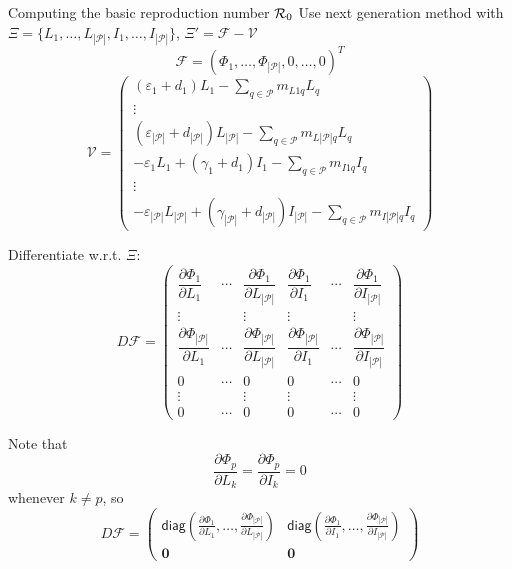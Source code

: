 \documentclass[aspectratio=169]{beamer}\usepackage[]{graphicx}\usepackage[]{xcolor}
\begin{document}
\begin{frame}{Computing the basic reproduction number $\mathcal{R}_0$}
Use next generation method with $\Xi=\{L_1,\ldots,L_{|\mathcal{P}|},I_1,\ldots,I_{|\mathcal{P}|}\}$, $\Xi'=\mathcal{F}-\mathcal{V}$
$$
\mathcal{F}=\left(\Phi_1,\ldots,\Phi_{|\mathcal{P}|},0,\ldots,0\right)^T
$$
$$
\mathcal{V}=
\begin{pmatrix}
\left( \varepsilon_{1}+d_{1}\right)L_{1}
-\sum\limits_{q\in\mathcal{P}} m_{L1q}L_{q} \\
\vdots \\
\left( \varepsilon_{|\mathcal{P}|}+d_{|\mathcal{P}|}\right)L_{|\mathcal{P}|}
-\sum\limits_{q\in\mathcal{P}} m_{L|\mathcal{P}|q}L_{q} \\
-\varepsilon_1L_1+(\gamma_1+d_1)I_1
-\sum\limits_{q\in\mathcal{P}} m_{I1q}I_{q} \\
\vdots \\
-\varepsilon_{|\mathcal{P}|}L_{|\mathcal{P}|}
+(\gamma_{|\mathcal{P}|}+d_{|\mathcal{P}|})I_{|\mathcal{P}|}
-\sum\limits_{q\in\mathcal{P}} m_{I|\mathcal{P}|q}I_{q}
\end{pmatrix}
$$
\end{frame}


\begin{frame}
Differentiate w.r.t. $\Xi$:
$$
D\mathcal{F}
=
\begin{pmatrix}
\dfrac{\partial\Phi_1}{\partial L_1} & \cdots &
\dfrac{\partial\Phi_1}{\partial L_{|\mathcal{P}|}} & 
\dfrac{\partial\Phi_1}{\partial I_1} & \cdots &
\dfrac{\partial\Phi_1}{\partial I_{|\mathcal{P}|}} \\
\vdots & & \vdots & \vdots & & \vdots \\
\dfrac{\partial\Phi_{|\mathcal{P}|}}{\partial L_1} & \cdots &
\dfrac{\partial\Phi_{|\mathcal{P}|}}{\partial L_{|\mathcal{P}|}} & 
\dfrac{\partial\Phi_{|\mathcal{P}|}}{\partial I_1} & \cdots &
\dfrac{\partial\Phi_{|\mathcal{P}|}}{\partial I_{|\mathcal{P}|}} \\
0 & \cdots & 0 & 0 & \cdots & 0 \\
\vdots & & \vdots & \vdots & & \vdots \\
0 & \cdots & 0 & 0 & \cdots & 0
\end{pmatrix}
$$
\end{frame}

\begin{frame}
Note that
$$
\frac{\partial\Phi_p}{\partial L_k}=\frac{\partial\Phi_p}{\partial I_k}=0
$$
whenever $k\neq p$, so
$$
D\mathcal{F}
=
\begin{pmatrix}
\mathsf{diag}\left(
\frac{\partial\Phi_1}{\partial L_1},\ldots,\frac{\partial\Phi_{|\mathcal{P}|}}{\partial L_{|\mathcal{P}|}}\right) &
\mathsf{diag}\left(
\frac{\partial\Phi_1}{\partial I_1},\ldots,\frac{\partial\Phi_{|\mathcal{P}|}}{\partial I_{|\mathcal{P}|}}\right) \\
\mathbf{0} & \mathbf{0} 
\end{pmatrix}
$$
\end{frame}
\end{document}

